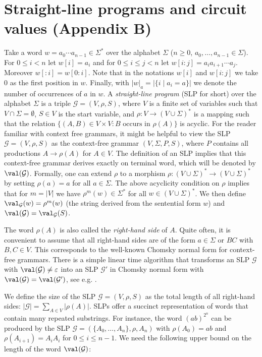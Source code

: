 \section*{Straight-line programs and circuit values (Appendix B)}

Take a word $w=a_0\cdots a_{n-1}\in\Sigma^*$ over the alphabet $\Sigma$ ($n\ge0$, $a_0,\ldots,a_{n-1}\in\Sigma$). For $0\le i<n$ let $w[i]=a_i$ and for $0\le i\le j<n$ let $w[i:j]=a_ia_{i+1}\cdots a_j$. Moreover $w[:i]=w[0:i]$. Note that in the notations $w[i]$ and $w[i:j]$ we take $0$ as the first position in $w$. Finally, with $|w|_a=|\{i\mid a_i=a\}|$ we denote the number of occurrences of $a$ in $w$.
A {\em straight-line program} (SLP for short) over the alphabet $\Sigma$ is a triple $\mathcal{G} = (V,\rho,S)$, where 
$V$ is a finite set of variables such that $V \cap \Sigma = \emptyset$, $S \in V$ is the start variable, and $\rho: V \to (V \cup \Sigma)^*$ is a mapping
such that the relation $\{ (A,B) \in V \times V \colon B \text{ occurs in } \rho(A) \}$
is acyclic. For the reader familiar with context free grammars, it might be helpful to view the SLP
$\mathcal{G} = (V,\rho,S)$ as the context-free grammar $(V,\Sigma, P, S)$, where $P$ contains all productions $A \to \rho(A)$ for $A \in V$.
The definition of an SLP implies that this context-free grammar derives exactly on terminal word, which will be denoted by
$\val(\mathcal{G})$. Formally, one can extend $\rho$ to a morphism $\rho : (V \cup \Sigma)^* \to (V \cup \Sigma)^*$ by setting
$\rho(a)=a$ for all $a \in \Sigma$. The above acyclicity condition on $\rho$ implies that for $m = |V|$ we have $\rho^m(w) \in \Sigma^*$ for all
$w \in (V \cup \Sigma)^*$. We then define $\val_{\mathcal{G}}(w) = \rho^m(w)$ (the string derived from the sentential form $w$) and 
$\val(\mathcal{G}) = \val_{\mathcal{G}}(S)$.

The word $\rho(A)$ is also called the {\em right-hand side} of $A$. 
Quite often, it is convenient to assume that all right-hand sides are of the form $a \in \Sigma$ or $BC$ with $B,C \in V$.
This corresponds to the well-known Chomsky normal form for context-free grammars. There is a simple linear time 
algorithm that transforms an SLP $\mathcal{G}$ with $\val(\mathcal{G}) \neq \varepsilon$ into an SLP $\mathcal{G}'$ in Chomsky normal
form with $\val(\mathcal{G}) = \val(\mathcal{G}')$, see e.g. \cite[Proposition 3.8]{ref38}.

We define the size of the SLP $\mathcal{G} = (V,\rho,S)$ as the total length of all right-hand sides:  $|\mathcal{G}| = \sum_{A \in V} |\rho(A)|$.
SLPs offer a succinct representation of words that contain many repeated substrings. For instance, the word $(ab)^{2^n}$ can be produced
by the SLP $\mathcal{G} = (\{A_0, \ldots,A_n\},\rho,A_n)$ with $\rho(A_0) = ab$ and $\rho(A_{i+1}) = A_i A_i$ for $0 \leq i \leq n-1$.
We need the following upper bound on the length of the word $\val(\mathcal{G})$:

